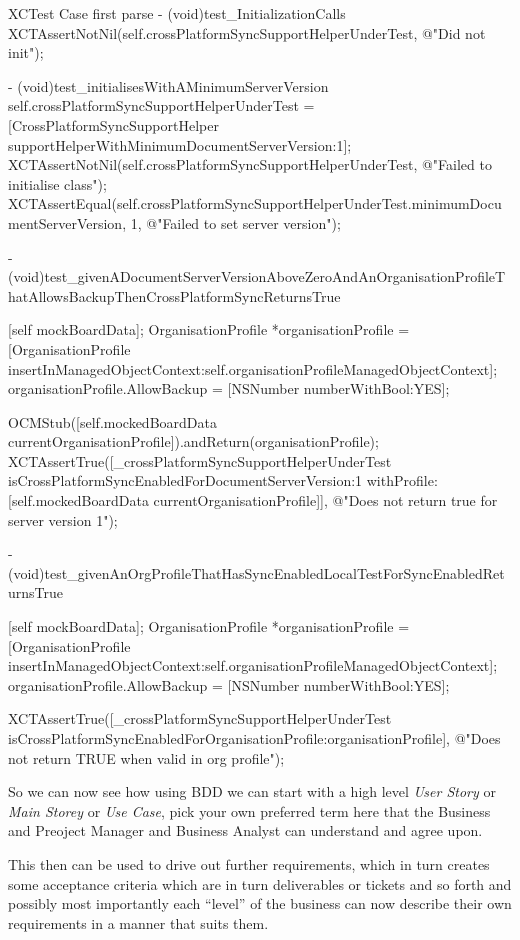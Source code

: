 \documentclass[a4paper, titlepage]{article}
\begin{document}
  \begin{listbox}{1}{XCTest Case first parse}
      - (void)test_InitializationCalls
      {
          XCTAssertNotNil(self.crossPlatformSyncSupportHelperUnderTest, @"Did not init");
      }

      - (void)test_initialisesWithAMinimumServerVersion
      {
          self.crossPlatformSyncSupportHelperUnderTest = [CrossPlatformSyncSupportHelper supportHelperWithMinimumDocumentServerVersion:1];
          XCTAssertNotNil(self.crossPlatformSyncSupportHelperUnderTest, @"Failed to initialise class");
          XCTAssertEqual(self.crossPlatformSyncSupportHelperUnderTest.minimumDocumentServerVersion, 1, @"Failed to set server version");
      }

      - (void)test_givenADocumentServerVersionAboveZeroAndAnOrganisationProfileThatAllowsBackupThenCrossPlatformSyncReturnsTrue
      {
          [self mockBoardData];
          OrganisationProfile *organisationProfile = [OrganisationProfile insertInManagedObjectContext:self.organisationProfileManagedObjectContext];
          organisationProfile.AllowBackup = [NSNumber numberWithBool:YES];

          OCMStub([self.mockedBoardData currentOrganisationProfile]).andReturn(organisationProfile);
          XCTAssertTrue([_crossPlatformSyncSupportHelperUnderTest
          isCrossPlatformSyncEnabledForDocumentServerVersion:1
          withProfile: [self.mockedBoardData currentOrganisationProfile]], @"Does not return true for server version 1");
      }

      - (void)test_givenAnOrgProfileThatHasSyncEnabledLocalTestForSyncEnabledReturnsTrue
      {
          [self mockBoardData];
          OrganisationProfile *organisationProfile = [OrganisationProfile insertInManagedObjectContext:self.organisationProfileManagedObjectContext];
          organisationProfile.AllowBackup = [NSNumber numberWithBool:YES];

          XCTAssertTrue([_crossPlatformSyncSupportHelperUnderTest isCrossPlatformSyncEnabledForOrganisationProfile:organisationProfile], @"Does not return TRUE when valid in org profile");
      }
  \end{listbox}


  So we can now see how using BDD we can start with a high level
  \textit{User
  Story} or \textit{Main Storey} or \textit{Use Case}, pick your own preferred term here
  that the Business and Preoject Manager and Business Analyst can
  understand and agree upon. 
  
  This then can be used to drive out further requirements, which in turn
  creates some acceptance criteria which are in turn deliverables or
  tickets and so forth and possibly most importantly each ``level'' of the
  business can now describe their own requirements in a manner that
  suits them.
\end{document}
